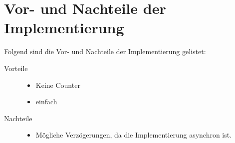 \documentclass[./\jobname.tex]{subfiles}
\begin{document}
\section{Vor- und Nachteile der Implementierung}
%
Folgend sind die Vor- und Nachteile der Implementierung gelistet:
%
\begin{description}
	\item[Vorteile] \hfil
	\begin{itemize}
		\item Keine Counter
		\item einfach
	\end{itemize}
	\item[Nachteile] \hfil
	\begin{itemize}
		\item Mögliche Verzögerungen, da die Implementierung asynchron ist.
	\end{itemize}
\end{description}
%
\end{document}

